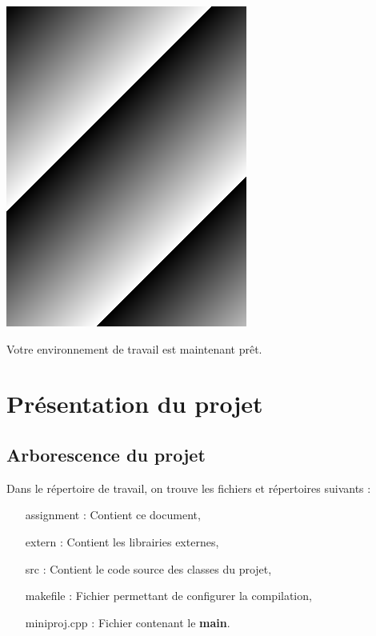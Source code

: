 \documentclass[
	12pt, %
]{fphw}
\begin{document}
\begin{center}
	\includegraphics[scale=0.5]{test_image.png}
\end{center}

Votre environnement de travail est maintenant prêt.


\section*{Présentation du projet}

\subsection*{Arborescence du projet}

Dans le répertoire de travail, on trouve les fichiers et répertoires suivants :
\begin{itemize}
	\item [assignment :] Contient ce document,
	\item [extern :] Contient les librairies externes,
	\item [src :] Contient le code source des classes du projet,
	\item [makefile :] Fichier permettant de configurer la compilation,
	\item [miniproj.cpp :] Fichier contenant le \textbf{main}. \\
\end{itemize}
\end{document}
